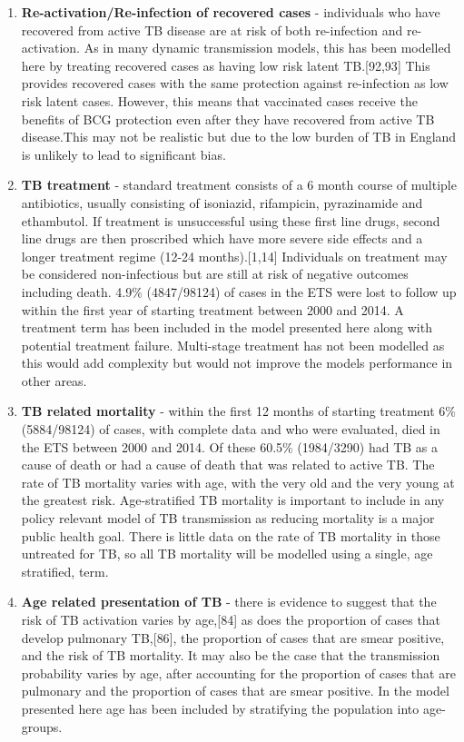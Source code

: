 \documentclass[11pt,twoside]{bristolthesis}
\begin{document}
\begin{enumerate}
  \item
    \textbf{Re-activation/Re-infection of recovered cases} - individuals who have recovered from active TB disease are at risk of both re-infection and re-activation. As in many dynamic transmission models, this has been modelled here by treating recovered cases as having low risk latent TB.{[}92,93{]} This provides recovered cases with the same protection against re-infection as low risk latent cases. However, this means that vaccinated cases receive the benefits of BCG protection even after they have recovered from active TB disease.This may not be realistic but due to the low burden of TB in England is unlikely to lead to significant bias.
  \item
    \textbf{TB treatment} - standard treatment consists of a 6 month course of multiple antibiotics, usually consisting of isoniazid, rifampicin, pyrazinamide and ethambutol. If treatment is unsuccessful using these first line drugs, second line drugs are then proscribed which have more severe side effects and a longer treatment regime (12-24 months).{[}1,14{]} Individuals on treatment may be considered non-infectious but are still at risk of negative outcomes including death. 4.9\% (4847/98124) of cases in the ETS were lost to follow up within the first year of starting treatment between 2000 and 2014. A treatment term has been included in the model presented here along with potential treatment failure. Multi-stage treatment has not been modelled as this would add complexity but would not improve the models performance in other areas.
  \item
    \textbf{TB related mortality} - within the first 12 months of starting treatment 6\% (5884/98124) of cases, with complete data and who were evaluated, died in the ETS between 2000 and 2014. Of these 60.5\% (1984/3290) had TB as a cause of death or had a cause of death that was related to active TB. The rate of TB mortality varies with age, with the very old and the very young at the greatest risk. Age-stratified TB mortality is important to include in any policy relevant model of TB transmission as reducing mortality is a major public health goal. There is little data on the rate of TB mortality in those untreated for TB, so all TB mortality will be modelled using a single, age stratified, term.
  \item
    \textbf{Age related presentation of TB} - there is evidence to suggest that the risk of TB activation varies by age,{[}84{]} as does the proportion of cases that develop pulmonary TB,{[}86{]}, the proportion of cases that are smear positive, and the risk of TB mortality. It may also be the case that the transmission probability varies by age, after accounting for the proportion of cases that are pulmonary and the proportion of cases that are smear positive. In the model presented here age has been included by stratifying the population into age-groups.

\end{enumerate}
\end{document}
